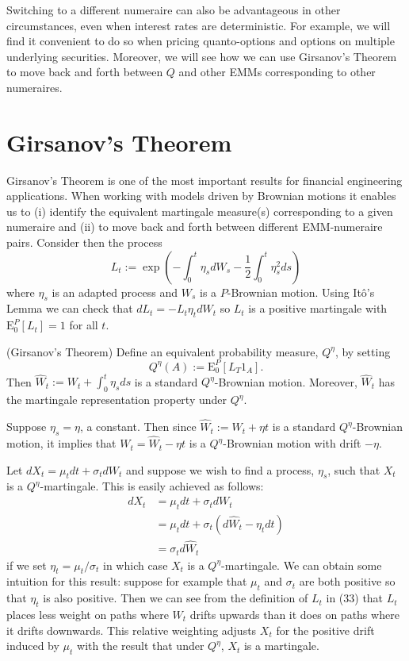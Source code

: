 Switching to a different numeraire can also be advantageous in other circumstances, even when interest rates are deterministic. For example, we will find it convenient to do so when pricing quanto-options and options on multiple underlying securities. Moreover, we will see how we can use Girsanov's Theorem to move back and forth between $Q$ and other EMMs corresponding to other numeraires.

\section{Girsanov's Theorem}
Girsanov's Theorem is one of the most important results for financial engineering applications. When working with models driven by Brownian motions it enables us to (i) identify the equivalent martingale measure(s) corresponding to a given numeraire and (ii) to move back and forth between different EMM-numeraire pairs. Consider then the process
\[L_t := \exp\left(-\int_0^t \eta_s dW_s - \frac{1}{2}\int_0^t \eta_s^2 ds\right) \tag{33}\]
where $\eta_s$ is an adapted process and $W_s$ is a $P$-Brownian motion. Using It\^o's Lemma we can check that $dL_t = -L_t \eta_t dW_t$ so $L_t$ is a positive martingale with $\mathrm{E}_0^P[L_t]=1$ for all $t$.

\begin{theorem} (Girsanov's Theorem)
Define an equivalent probability measure, $Q^\eta$, by setting
\[Q^\eta(A):=\mathrm{E}_0^P[L_T 1_A]. \tag{34}\]
Then $\widehat{W}_t:=W_t+\int_0^t \eta_s ds$ is a standard $Q^\eta$-Brownian motion. Moreover, $\widehat{W}_t$ has the martingale representation property under $Q^\eta$.
\end{theorem}

\begin{remark}
Suppose $\eta_s=\eta$, a constant. Then since $\widehat{W}_t:=W_t+\eta t$ is a standard $Q^\eta$-Brownian motion, it implies that $W_t=\widehat{W}_t-\eta t$ is a $Q^\eta$-Brownian motion with drift $-\eta$.
\end{remark}

\begin{example}
Let $dX_t=\mu_t dt + \sigma_t dW_t$ and suppose we wish to find a process, $\eta_s$, such that $X_t$ is a $Q^\eta$-martingale. This is easily achieved as follows:
\begin{align*}
dX_t &= \mu_t dt + \sigma_t dW_t \\
&= \mu_t dt + \sigma_t (d\widehat{W}_t - \eta_t dt) \\
&= \sigma_t d\widehat{W}_t
\end{align*}
if we set $\eta_t=\mu_t/\sigma_t$ in which case $X_t$ is a $Q^\eta$-martingale. We can obtain some intuition for this result: suppose for example that $\mu_t$ and $\sigma_t$ are both positive so that $\eta_t$ is also positive. Then we can see from the definition of $L_t$ in (33) that $L_t$ places less weight on paths where $W_t$ drifts upwards than it does on paths where it drifts downwards. This relative weighting adjusts $X_t$ for the positive drift induced by $\mu_t$ with the result that under $Q^\eta$, $X_t$ is a martingale.
\end{example}

